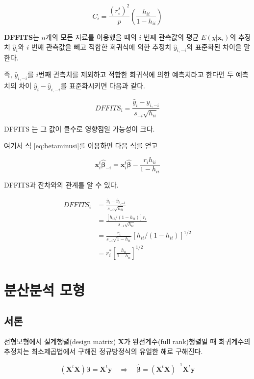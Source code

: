 \documentclass[
]{book}
\theoremstyle{definition}
\theoremstyle{definition}
\theoremstyle{definition}
\theoremstyle{definition}
\theoremstyle{remark}
\begin{document}
\[ C_i = \frac{ (r^s_i)^2}{p} \left ( \frac{h_{ii} }{1-h_{ii}} \right ) \]

\textbf{DFFITS}는 \(n\)개의 모든 자료를 이용했을 때의 \(i\) 번째 관측값의 평균
\(E(y|\bm x_i)\)의 추정치 \(\hat y_i\)와 \(i\) 번쨰 관측값을 빼고 적합한
회귀식에 의한 추정치 \(\hat y_{i,-i}\)의 표준화된 차이을 말한다.

즉, \(\hat y_{i,-i}\)를 \(i\)번째 관측치를 제외하고 적합한 회귀식에 의한
예측치라고 한다면 두 예측치의 차이 \(\hat y_i - \hat y_{i,-i}\)를
표준화시키면 다음과 같다.

\begin{equation}
 DFFITS_i = \frac{\hat y_i - \hat y_{i,-i}}{s_{-i}\sqrt{h_{ii}}}  
\label{eq:dffits}
\end{equation}

DFFITS 는 그 값이 클수로 영향점일 가능성이 크다.

여기서 식 \eqref{eq:betaminusi}를 이용하면 다음 식를 얻고

\[ {\bm x}_i^t \hat{ \bm \beta}_{-i} =\bm x_i^t \hat{ \bm \beta} -\frac{r_i h_{ii}}{1-h_{ii}}\]

DFFITS과 잔차와의 관계를 알 수 있다.

\begin{align*}
DFFITS_i & = \frac{\hat y_i - \hat y_{i,-i}}{s_{-i}\sqrt{h_{ii}}}  \\
& =  \frac{ [h_{ii}/(1-h_{ii})]r_i } {s_{-i}\sqrt{h_{ii}}} \\
& =  \frac{ r_i } {s_{-i}\sqrt{1-h_{ii}}} [h_{ii}/(1-h_{ii})]^{1/2} \\
&= r^*_i \left [\frac{h_{ii}}{1-h_{ii}} \right ]^{1/2}
\end{align*}

\hypertarget{notfullrank}{%
\chapter{분산분석 모형}\label{notfullrank}}

\hypertarget{uxc11cuxb860-1}{%
\section{서론}\label{uxc11cuxb860-1}}

선형모형에서 설계행렬(design matrix) \(\bm X\)가 완전계수(full rank)행렬일 때 회귀계수의 추정치는 최소제곱법에서 구해진 정규방정식의 유일한 해로 구해진다.

\[
(\bm X^t \bm X ) \bm \beta = \bm X^t \bm y \quad \Rightarrow \quad \hat {\bm \beta} = (\bm X^t \bm X )^{-1} \bm X^t \bm y 
\]
\end{document}
